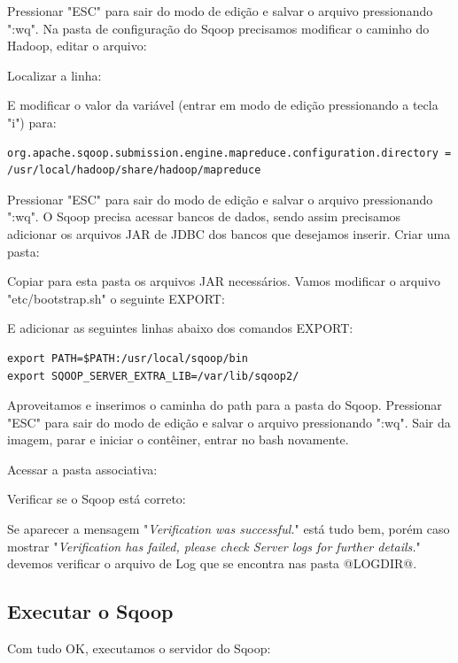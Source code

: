 \documentclass[a4paper,11pt]{article}
\begin{document}
Pressionar "ESC" para sair do modo de edição e salvar o arquivo pressionando ":wq". Na pasta de configuração do Sqoop precisamos modificar o caminho do Hadoop, editar o arquivo: \\

Localizar a linha: \\

E modificar o valor da variável (entrar em modo de edição pressionando a tecla "i") para:
\begin{lstlisting}[]
org.apache.sqoop.submission.engine.mapreduce.configuration.directory = /usr/local/hadoop/share/hadoop/mapreduce
\end{lstlisting}

Pressionar "ESC" para sair do modo de edição e salvar o arquivo pressionando ":wq". O Sqoop precisa acessar bancos de dados, sendo assim precisamos adicionar os arquivos JAR de JDBC dos bancos que desejamos inserir. Criar uma pasta: \\

Copiar para esta pasta os arquivos JAR necessários. Vamos modificar o arquivo "etc/bootstrap.sh" o seguinte EXPORT: \\

E adicionar as seguintes linhas abaixo dos comandos EXPORT:
\begin{lstlisting}[]
export PATH=$PATH:/usr/local/sqoop/bin
export SQOOP_SERVER_EXTRA_LIB=/var/lib/sqoop2/
\end{lstlisting}

Aproveitamos e inserimos o caminha do path para a pasta do Sqoop. Pressionar "ESC" para sair do modo de edição e salvar o arquivo pressionando ":wq".  Sair da imagem, parar e iniciar o contêiner, entrar no bash novamente.

Acessar a pasta associativa: \\

Verificar se o Sqoop está correto: \\

Se aparecer a mensagem "\textit{Verification was successful.}" está tudo bem, porém caso mostrar "\textit{Verification has failed, please check Server logs for further details.}" devemos verificar o arquivo de Log que se encontra nas pasta @LOGDIR@.

\subsection{Executar o Sqoop}
Com tudo OK, executamos o servidor do Sqoop: \\
\end{document}
